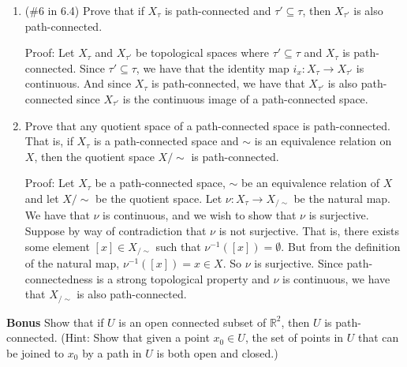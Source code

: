 \documentclass[12pt]{article}
\begin{document}
\begin{enumerate}
\begin{enumerate}
\end{enumerate}
\item(\#6 in 6.4) Prove that if $X_{\tau}$ is path-connected and $\tau' \subseteq \tau$, then $X_{\tau'}$ is also path-connected.

Proof: Let $X_{\tau}$ and $X_{\tau'}$ be topological spaces where $\tau' \subseteq \tau$ and $X_{\tau}$ is path-connected. 
Since $\tau' \subseteq \tau$, we have that the identity map $i_x: X_{\tau} \to X_{\tau'}$ is continuous. And since $X_{\tau}$ is path-connected, we have that $X_{\tau'}$ is also path-connected since $X_{\tau'}$ is the continuous image of a path-connected space.



\item Prove that any quotient space of a path-connected space is path-connected. That is, if $X_{\tau}$ is a path-connected space and $\sim$ is an equivalence relation on $X$, then the quotient space $X/\sim$ is path-connected.

Proof: Let $X_{\tau}$ be a path-connected space, $\sim$ be an equivalence relation of $X$ and let $X/\sim$ be the quotient space.
Let $\nu: X_{\tau} \to X_{/\sim}$ be the natural map. We have that $\nu$ is continuous, and we wish to show that $\nu$ is surjective. Suppose by way of contradiction that $\nu$ is not surjective. That is, there exists some element $[x] \in X_{/\sim}$ such that $\nu^{-1}([x]) = \emptyset$. But from the definition of the natural map, $\nu^{-1}([x]) = x \in X$. So $\nu$ is surjective. Since path-connectedness is a strong topological property and $\nu$ is continuous, we have that $X_{/\sim}$ is also path-connected.


\end{enumerate}

\noindent \textbf{Bonus} Show that if $U$ is an open connected subset of $\mathbb{R}^2$, then $U$ is path-connected. (Hint: Show that given a point $x_0\in U$, the set of points in $U$ that can be joined to $x_0$ by a path in $U$ is both open and closed.)
\end{document}
